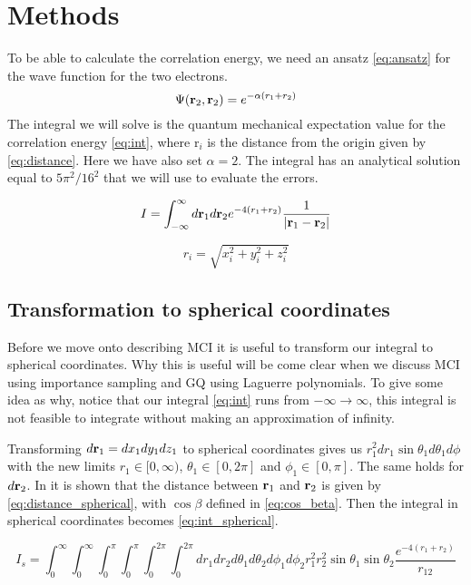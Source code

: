 \section{Methods}
To be able to calculate the correlation energy, we need an ansatz
\cref{eq:ansatz} for the wave function for the two electrons.
\begin{equation}\label{eq:ansatz}
  \Psi(\mathbf{r}_2, \mathbf{r}_2) = e^{-\alpha(r_1 + r_2)}
\end{equation}
The integral we will solve is the quantum
mechanical expectation value for the correlation energy \cref{eq:int},
where r$_i$ is the distance from the origin given by \cref{eq:distance}.
Here we have also set $\alpha = 2$. The integral has an analytical solution
equal to $5\pi^2/16^2$ that we will use to evaluate the errors.

\begin{equation}
  \label{eq:int}
  I = \int_{-\infty}^{\infty} d\mathbf{r}_1 d\mathbf{r}_2 e^{-4(r_1+r_2)}
  \frac{1}{\abs{\mathbf{r}_1 - \mathbf{r}_2}}
\end{equation}

\begin{equation}
  \label{eq:distance}
r_i = \sqrt{x_i^2 + y_i^2 + z_i^2}
\end{equation}

\subsection{Transformation to spherical coordinates}
Before we move onto describing MCI it is useful to transform our integral to
spherical coordinates. Why this is useful will be come clear when we discuss
MCI using importance sampling and GQ using Laguerre polynomials. To give some idea
as why, notice that our integral \cref{eq:int} runs from $-\infty \to \infty$,
this integral is not feasible to integrate without making an approximation of infinity.

Transforming $d\mathbf{r}_1 = dx_1dy_1dz_1$ to spherical coordinates gives us
$r_1^2 dr_1 \sin{\theta_1}d\theta_1 d\phi$ with the new limits $r_1 \in [0, \infty)$,
 $\theta_1 \in [0, 2\pi]$ and $\phi_1 \in [0,\pi]$. The same holds for $d\mathbf{r}_2$.
In \cite{lectures} it is shown that the distance between $\mathbf{r}_1$ and $\mathbf{r}_2$ is given by
\cref{eq:distance_spherical}, with $\cos{\beta}$ defined in \cref{eq:cos_beta}.
Then the integral in spherical coordinates becomes \cref{eq:int_spherical}.

\begin{equation}
  \label{eq:int_spherical}
  I_s = \int_{0}^{\infty} \int_{0}^{\infty} \int_{0}^{\pi} \int_{0}^{\pi}
  \int_{0}^{2\pi} \int_{0}^{2\pi}
  dr_1 dr_2 d\theta_1 d\theta_2 d\phi_1 d\phi_2
  r_1^2 r_2^2 \sin{\theta_1} \sin{\theta_2} \frac{e^{-4(r_1 + r_2)}}{r_{12}}
\end{equation}

